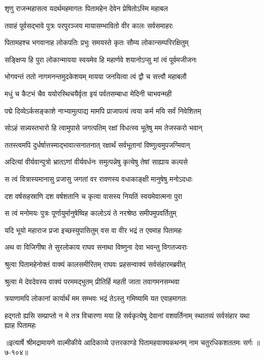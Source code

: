 
\twolineshloka
{शृणु राजन्महासत्व यदर्थमहमागतः}
{पितामहेन देवेन प्रेषितोऽस्मि महाबल} %

\twolineshloka
{तवाहं पूर्वसद्भावे पुत्रः परपुरञ्जय}
{मायासम्भावितो वीर कालः सर्वसमाहरः} %

\twolineshloka
{पितामहश्च भगवानाह लोकपतिः प्रभुः}
{समयस्ते कृतः सौम्य लोकान्सम्परिरक्षितुम्} %

\twolineshloka
{सङ्क्षिप्य हि पुरा लोकान्मायया स्वयमेव हि}
{महार्णवे शयानोऽप्सु मां त्वं पूर्वमजीजनः} %

\twolineshloka
{भोगवन्तं ततो नागमनन्तमुदकेशयम्}
{मायया जनयित्वा त्वं द्वौ च सत्त्वौ महाबलौ} %

\twolineshloka
{मधुं च कैटभं चैव ययोरस्थिचयैर्वृता}
{इयं पर्वतसम्बाधा मेदिनी चाभवन्मही} %

\twolineshloka
{पद्मे दिव्येऽर्कसङ्काशे नाभ्यामुत्पाद्य मामपि}
{प्राजापत्यं त्वया कर्म मयि सर्वं निवेशितम्} %

\twolineshloka
{सोऽहं सन्न्यस्तभारो हि त्वामुपासे जगत्पतिम्}
{रक्षां विधत्स्व भूतेषु मम तेजस्करो भवान्} %

\twolineshloka
{ततस्त्वमपि दुर्धर्षात्तस्माद्भावात्सनातनात्}
{रक्षार्थं सर्वभूतानां विष्णुत्वमुपजग्मिवान्} %

\twolineshloka
{अदित्यां वीर्यवान्पुत्रो भ्रातऽणां वीर्यवर्धनः}
{समुत्पन्नेषु कृत्येषु तेषां साह्याय कल्पसे} %

\twolineshloka
{स त्वं वित्रास्यमानासु प्रजासु जगतां वर}
{रावणस्य वधाकाङ्क्षी मानुषेषु मनोऽदधाः} %

\twolineshloka
{दश वर्षसहस्राणि दश वर्षशतानि च}
{कृत्वा वासस्य नियतिं स्वयमेवात्मना पुरा} %

\twolineshloka
{स त्वं मनोमयः पुत्रः पूर्णायुर्मानुषेष्विह}
{कालोऽयं ते नरश्रेष्ठ समीपमुपवर्तितुम्} %

\twolineshloka
{यदि भूयो महाराज प्रजा इच्छस्युपासितुम्}
{वस वा वीर भद्रं त एवमाह पितामहः} %

\twolineshloka
{अथ वा विजिगीषा ते सुरलोकाय राघव}
{सनाथा विष्णुना देवा भवन्तु विगतज्वराः} %

\twolineshloka
{श्रुत्वा पितामहेनोक्तं वाक्यं कालसमीरितम्}
{राघवः प्रहसन्वाक्यं सर्वसंहारमब्रवीत्} %

\twolineshloka
{श्रुत्वा मे देवदेवस्य वाक्यं परममद्भुतम्}
{प्रीतिर्हि महती जाता तवागमनसम्भवा} %

\twolineshloka
{त्रयाणामपि लोकानां कार्यार्थं मम सम्भवः}
{भद्रं तेऽस्तु गमिष्यामि यत एवाहमागतः} %

\threelineshloka
{हद्गतो ह्यसि सम्प्राप्तो न मे तत्र विचारणा}
{मया हि सर्वकृत्येषु देवानां वशवर्तिनाम्}
{स्थातव्यं सर्वसंहार यथा ह्याह पितामहः} %


॥इत्यार्षे श्रीमद्रामायणे वाल्मीकीये आदिकाव्ये उत्तरकाण्डे पितामहवाक्यकथनम् नाम चतुरधिकशततमः सर्गः ॥७-१०४॥
